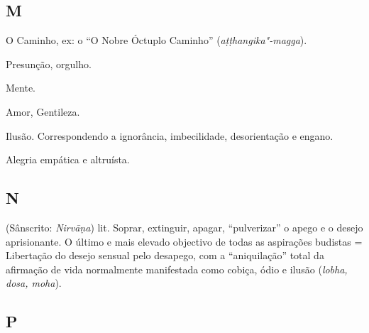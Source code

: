 \subsection{M}

\begin{glossarydescription}

\item[Magga] O Caminho, ex: o ``O Nobre Óctuplo Caminho''
(\emph{aṭṭhangika"-magga}).

\item[Māna] Presunção, orgulho.

\item[Mano] Mente.

\item[Mettā] Amor, Gentileza.

\item[Moha] Ilusão. Correspondendo a ignorância, imbecilidade, desorientação e
engano.

\item[Muditā] Alegria empática e altruísta.

\end{glossarydescription}

\subsection{N}

\begin{glossarydescription}

\item[Nibbāna] (Sânscrito: \emph{Nirvāṇa}) lit. Soprar, extinguir, apagar,
``pulverizar'' o apego e o desejo aprisionante. O último e mais elevado
objectivo de todas as aspirações budistas = Libertação do desejo sensual pelo
desapego, com a ``aniquilação'' total da afirmação de vida normalmente
manifestada como cobiça, ódio e ilusão (\emph{lobha, dosa, moha}).

\end{glossarydescription}

\subsection{P}

